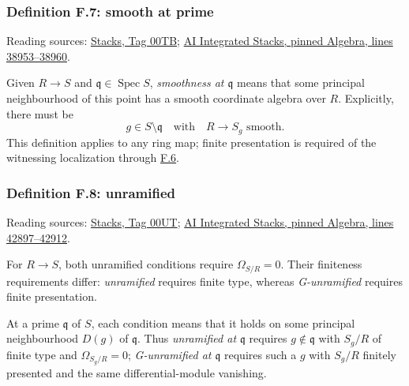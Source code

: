 \documentclass[11pt,a4paper,openany]{report}
\begin{document}
\label{AG-RG-S05-algebra-definition-smooth-at-prime}

\subsubsection{Definition F.7: smooth at prime}\label{AG-RG-S05-definition-f.7-smooth-at-prime}

Reading sources: \href{https://stacks.math.columbia.edu/tag/00TB}{Stacks, Tag 00TB}; \href{https://github.com/KokunoYumeto/unofficial-stacks-project-ai-drafts/blob/565b10e987aba5969b21145a0833f42d69f96790/algebra.tex\#L38953-L38960}{AI Integrated Stacks, pinned Algebra, lines 38953--38960}.

Given \(R\to S\) and \(\mathfrak q\in\operatorname{Spec}S\), \emph{smoothness at \(\mathfrak q\)} means that some principal neighbourhood of this point has a smooth coordinate algebra over \(R\). Explicitly, there must be \[g\in S\setminus\mathfrak q\quad\text{with}\quad R\to S_g\text{ smooth}.\] This definition applies to any ring map; finite presentation is required of the witnessing localization through \hyperref[AG-RG-S05-algebra-definition-smooth]{F.6}.

\label{AG-RG-S05-algebra-definition-unramified}

\subsubsection{Definition F.8: unramified}\label{AG-RG-S05-definition-f.8-unramified}

Reading sources: \href{https://stacks.math.columbia.edu/tag/00UT}{Stacks, Tag 00UT}; \href{https://github.com/KokunoYumeto/unofficial-stacks-project-ai-drafts/blob/565b10e987aba5969b21145a0833f42d69f96790/algebra.tex\#L42897-L42912}{AI Integrated Stacks, pinned Algebra, lines 42897--42912}.

For \(R\to S\), both unramified conditions require \(\Omega_{S/R}=0\). Their finiteness requirements differ: \emph{unramified} requires finite type, whereas \emph{G-unramified} requires finite presentation.

At a prime \(\mathfrak q\) of \(S\), each condition means that it holds on some principal neighbourhood \(D(g)\) of \(\mathfrak q\). Thus \emph{unramified at \(\mathfrak q\)} requires \(g\notin\mathfrak q\) with \(S_g/R\) of finite type and \(\Omega_{S_g/R}=0\); \emph{G-unramified at \(\mathfrak q\)} requires such a \(g\) with \(S_g/R\) finitely presented and the same differential-module vanishing.
\end{document}
